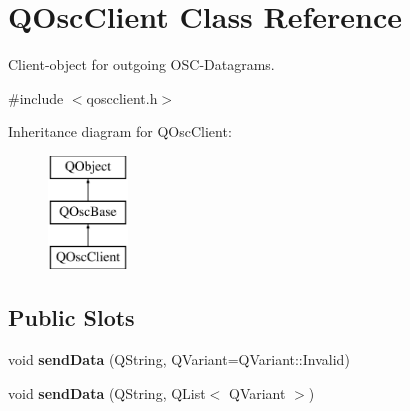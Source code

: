 \hypertarget{class_q_osc_client}{}\section{Q\+Osc\+Client Class Reference}
\label{class_q_osc_client}


Client-\/object for outgoing O\+S\+C-\/\+Datagrams.  




{\ttfamily \#include $<$qoscclient.\+h$>$}

Inheritance diagram for Q\+Osc\+Client\+:\begin{figure}[H]
\begin{center}
\leavevmode
\includegraphics[height=3.000000cm]{class_q_osc_client}
\end{center}
\end{figure}
\subsection*{Public Slots}
\begin{DoxyCompactItemize}
\item 
\mbox{\label{class_q_osc_client_a16771971f1d519f2850099822c4843f9}} 
void {\bfseries send\+Data} (Q\+String, Q\+Variant=Q\+Variant\+::\+Invalid)
\item 
\mbox{\label{class_q_osc_client_afe20a6eda1ca57c6bacbefc37b6d1e71}} 
void {\bfseries send\+Data} (Q\+String, Q\+List$<$ Q\+Variant $>$)
\end{DoxyCompactItemize}
